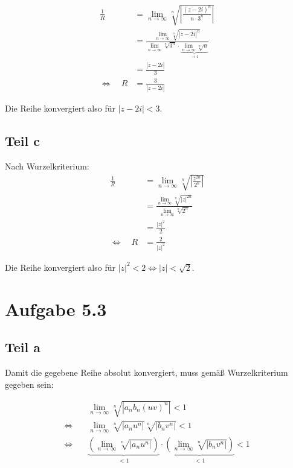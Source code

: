 \documentclass[a4paper,german,12pt,smallheadings]{scrartcl}
\begin{document}
\begin{align*}
  \frac{1}{R} &= \lim_{n \to \infty} \sqrt[n]{\left|\frac{(z-2i)^n}{n\cdot3^n}\right|} \\
              &= \frac{\lim_{n \to \infty} \sqrt[n]{|z-2i|^n}}{\lim_{n \to \infty} \sqrt[n]{3^n} \cdot \underbrace{\lim_{n \to \infty} \sqrt[n]{n}}_{\to 1}} \\
              &= \frac{|z-2i|}{3} \\
  \Leftrightarrow\quad R &= \frac{3}{|z-2i|}
\end{align*}

Die Reihe konvergiert also für $|z-2i| < 3$.

\subsection*{Teil c}
Nach Wurzelkriterium:
\begin{align*}
  \frac{1}{R} &= \lim_{n \to \infty} \sqrt[n]{\left|\frac{z^{2n}}{2^n}\right|} \\
              &= \frac{\lim_{n \to \infty} \sqrt[n]{|z|^{2n}}}{\lim_{n \to \infty} \sqrt[n]{2^n}} \\
              &= \frac{|z|^2}{2} \\
  \Leftrightarrow\quad R &= \frac{2}{|z|^2}
\end{align*}

Die Reihe konvergiert also für $|z|^2 < 2 \Leftrightarrow |z| < \sqrt{2}$.

\section*{Aufgabe 5.3}
\subsection*{Teil a}

Damit die gegebene Reihe absolut konvergiert, muss gemäß Wurzelkriterium gegeben sein:

\begin{align*}
  &\lim_{n \to \infty} \sqrt[n]{|a_nb_n(uv)^n|} < 1 \\
 \Leftrightarrow\quad&\lim_{n \to \infty} \sqrt[n]{|a_nu^n|} \sqrt[n]{|b_nv^n|} < 1 \\
 \Leftrightarrow\quad&\underbrace{\left(\lim_{n \to \infty} \sqrt[n]{|a_nu^n|}\right)}_{<1} \cdot \underbrace{\left(\lim_{n \to \infty} \sqrt[n]{|b_nv^n|}\right)}_{<1} < 1 \\
\end{align*}
\end{document}
